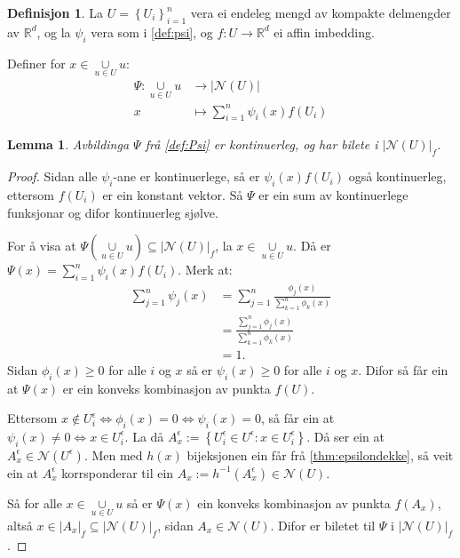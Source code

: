 \documentclass[a4paper, 12pt, norsk]{article}
\theoremstyle{plain}
\newtheorem{lemma}[theorem]{Lemma}
\theoremstyle{definition}
\newtheorem{definition}[theorem]{Definisjon}
\newcommand{\Rb}{\mathbb{R}}
\newcommand{\Nc}{\mathcal{N}}
\newcommand{\union}{ \mathop{\cup}\limits }
\newcommand{\gr}[1]{ \lvert #1 \rvert } %
\newcommand{\set}[1]{ \left\{ #1 \right\} } %
\newcommand{\tuple}[1]{ \left( #1 \right) } %
\begin{document}
\begin{definition} \label{def:Psi}
	La \( U = \set{U_i}_{i=1}^n \) vera ei endeleg mengd av kompakte delmengder av \( \Rb^d \), og la \( \psi_i \) vera som i \autoref{def:psi}, og \( f: U \to \Rb^d \) ei affin imbedding. 
	
	Definer for \( x \in \union_{u \in U} u \):
	\begin{align*}
		\Psi : \union_{u \in U} u &\to \gr{\Nc(U)} \\
		x &\mapsto \sum_{i=1}^n \psi_i(x)f(U_i)
	\end{align*}
\end{definition}

\begin{lemma} \label{thm:psi-kont}
	Avbildinga \( \Psi \) frå \autoref{def:Psi} er kontinuerleg, og har bilete i \( \gr{\Nc(U)}_f \).
\end{lemma}

\begin{proof}
	Sidan alle \( \psi_i \)-ane er kontinuerlege, så er \( \psi_i(x) f(U_i) \) også kontinuerleg, ettersom \( f(U_i) \) er ein konstant vektor. Så \( \Psi \) er ein sum av kontinuerlege funksjonar og difor kontinuerleg sjølve.

	For å visa at \( \Psi\tuple{\union_{u \in U} u} \subseteq \gr{\Nc(U)}_f \), la \( x \in \union_{u \in U} u \). Då er \( \Psi(x) = \sum_{i=1}^n \psi_i(x)f(U_i) \). Merk at:
	\begin{align*}
		\sum_{j=1}^n \psi_j(x)  &= \sum_{j=1}^n \frac{\phi_j(x)}{\sum_{k=1}^n \phi_k(x)} \\
		&= \frac{\sum_{j=1}^n \phi_j(x)}{\sum_{k=1}^n \phi_k(x)} \\
		&= 1.
	\end{align*}
	Sidan \( \phi_i(x) \geq 0 \) for alle \( i \) og \( x \) så er \( \psi_i(x) \geq 0 \) for alle \( i \) og \( x \). Difor så får ein at \( \Psi(x) \) er ein konveks kombinasjon av punkta \( f(U) \).

	Ettersom \( x \not\in U_i^\epsilon \iff \phi_i(x) = 0 \iff \psi_i(x) = 0 \), så får ein at \( \psi_i(x) \neq 0 \iff x \in U_i^\epsilon \). La då \( A_x^\epsilon := \set{U_i^\epsilon \in U^\epsilon : x \in U_i^\epsilon} \). Då ser ein at \( A_x^\epsilon \in \Nc(U^\epsilon) \). Men med \( h(x) \) bijeksjonen ein får frå \autoref{thm:epsilondekke}, så veit ein at \( A_x^\epsilon \) korrsponderar til ein \( A_x := h^{-1}(A_x^\epsilon) \in \Nc(U) \).
	
	Så for alle \( x \in \union_{u \in U} u \) så er \( \Psi(x) \) ein konveks kombinasjon av punkta \( f(A_x) \), altså \( x \in \gr{A_x}_f \subseteq \gr{\Nc(U)}_f \), sidan \( A_x \in \Nc(U) \). Difor er biletet til \( \Psi \) i \( \gr{\Nc(U)}_f \).
\end{proof}
\end{document}

